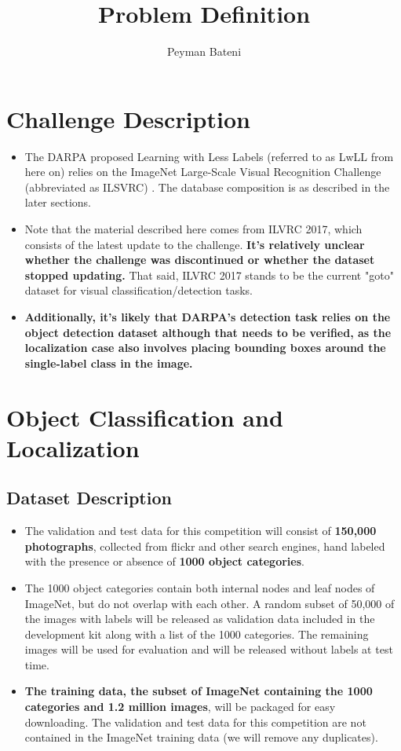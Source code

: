 \documentclass{article}
\title{Problem Definition}
\author{Peyman Bateni}
\begin{document}
\maketitle

\section{Challenge Description}
\begin{itemize}
    \item The DARPA proposed Learning with Less Labels (referred to as LwLL from here on) relies on the ImageNet Large-Scale Visual Recognition Challenge (abbreviated as ILSVRC) \cite{ILSVRC15}. The database composition is as described in the later sections. 
    \item Note that the material described here comes from ILVRC 2017, which consists of the latest update to the challenge. \textbf{It's relatively unclear whether the challenge was discontinued or whether the dataset stopped updating.} That said, ILVRC 2017 stands to be the current "goto" dataset for visual classification/detection tasks.
    \item \textbf{Additionally, it's likely that DARPA's detection task relies on the object detection dataset although that needs to be verified, as the localization case also involves placing bounding boxes around the single-label class in the image.}
\end{itemize}

\section{Object Classification and Localization}
\subsection{Dataset Description}
\begin{itemize}
    \item The validation and test data for this competition will consist of \textbf{150,000 photographs}, collected from flickr and other search engines, hand labeled with the presence or absence of \textbf{1000 object categories}.
    \item The 1000 object categories contain both internal nodes and leaf nodes of ImageNet, but do not overlap with each other. A random subset of 50,000 of the images with labels will be released as validation data included in the development kit along with a list of the 1000 categories. The remaining images will be used for evaluation and will be released without labels at test time.
    \item \textbf{The training data, the subset of ImageNet containing the 1000 categories and 1.2 million images}, will be packaged for easy downloading. The validation and test data for this competition are not contained in the ImageNet training data (we will remove any duplicates).
\end{itemize}
\end{document}
